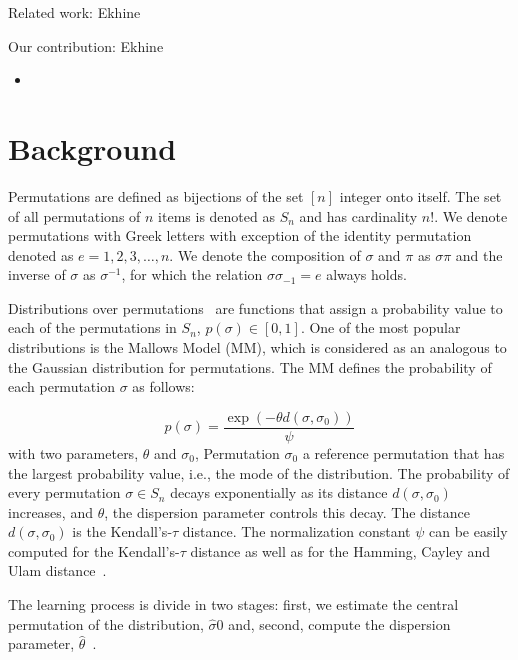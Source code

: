 \documentclass[runningheads]{llncs}
\begin{document}

Related work: Ekhine

Our contribution: Ekhine
\begin{itemize}
\item 
\end{itemize}


\citep{LopDubPerStuBir2016irace}

\section{Background}\label{sec:backgroud}

Permutations are defined as bijections of the set $[n]$ integer onto itself. The set of all permutations of $n$ items is denoted as $S_n$ and has cardinality $n!$. We denote permutations with Greek letters with exception of the identity permutation denoted as $e=1, 2, 3, \ldots,n$. We denote the composition of $\sigma$ and $\pi$ as $\sigma\pi$ and the inverse of $\sigma$ as $\sigma^{-1}$, for which the relation $\sigma\sigma_{-1}=e$ always holds. 

Distributions over permutations~\cite{critchlow91} are functions that assign a probability value to each of the permutations in $S_n$, $p(\sigma)\in[0,1]$. One of the most popular distributions is the Mallows Model (MM), which is considered as an analogous to the Gaussian distribution for permutations. The MM defines the probability of each permutation $\sigma$ as follows:

\begin{equation}
p(\sigma)=\frac{\exp(-\theta d(\sigma, \sigma_0))}{\psi}
\end{equation}
with two parameters, $\theta$ and $\sigma_0$, Permutation $\sigma_0$ a reference permutation that has the largest probability value, i.e., the mode of the distribution. The probability of every permutation $\sigma\in S_n$ decays exponentially as its distance $d(\sigma,\sigma_0)$ increases, and $\theta$, the dispersion parameter controls this decay. The distance $d(\sigma,\sigma_0)$ is the Kendall's-$\tau$ distance. The normalization constant $\psi$ can be easily computed for the Kendall's-$\tau$ distance as well as for the Hamming, Cayley and Ulam distance~\cite{Irurozki2016b}. 

The learning process is divide in two stages: first, we estimate the central permutation of the distribution, $\hat\sigma0$ and, second, compute the dispersion parameter, $\hat\theta$~\cite{Irurozki2016b}. 
\end{document}
